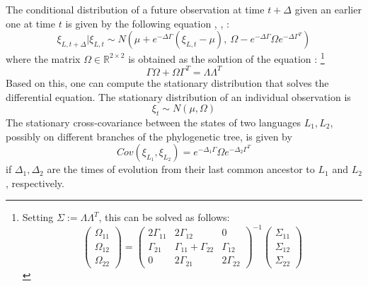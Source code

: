 \documentclass[11pt,a4paper]{article}
\begin{document}
The conditional distribution of a future observation at time $t+\Delta$ given an earlier one at time $t$ is given by the following equation \citep[Theorem 3.3]{schach1971weak}, \citep{gardiner1983handbook}, \citep[p. 156, eq. 6.124]{risken1989fokker}:
\begin{equation}
\xi_{L,t+\Delta} | \xi_{L,t} \sim N\left(\mu + e^{-\Delta \Gamma} (\xi_{L,t}-\mu),\ \Omega - e^{-\Delta \Gamma} \Omega e^{-\Delta \Gamma^T}\right)
\end{equation}
where the matrix $\Omega \in \mathbb{R}^{2\times 2}$ is obtained as the solution of the equation \citep[p. 110, eq. 4.4.51]{gardiner1983handbook} \citep[p. 156, eq. 6.126]{risken1989fokker}:
\footnote{Setting $\Sigma := \Lambda\Lambda^T$, this can be solved as follows:
\begin{equation}
\left(\begin{matrix} \Omega_{11} \\ \Omega_{12} \\ \Omega_{22} \end{matrix}\right)=    \left(\begin{matrix}
    2\Gamma_{11} & 2\Gamma_{12} & 0 \\
    \Gamma_{21} & \Gamma_{11}+\Gamma_{22} & \Gamma_{12} \\
    0 & 2\Gamma_{21} & 2\Gamma_{22}
    \end{matrix}\right)^{-1}  \left(\begin{matrix} \Sigma_{11} \\ \Sigma_{12} \\ \Sigma_{22} \end{matrix}\right)
\end{equation}
}
\begin{equation}
    \Gamma\Omega+\Omega\Gamma^T = \Lambda \Lambda^T
\end{equation}
Based on this, one can compute the stationary distribution that solves the differential equation.
The stationary distribution of an individual observation is
\begin{equation}\label{eq:ornuhl-var}
\xi_{t} \sim N\left(\mu, \Omega \right)
\end{equation}
The stationary cross-covariance between the states of two languages $L_1, L_2$, possibly on different branches of the phylogenetic tree, is given by
\begin{equation}\label{eq:ornuhl-covar}
Cov(\xi_{L_1}, \xi_{L_2}) = e^{-\Delta_1 \Gamma} \Omega e^{-\Delta_2 \Gamma^T}
\end{equation}
if $\Delta_1, \Delta_2$ are the times of evolution from their last common ancestor to $L_1$ and $L_2$, respectively.
\end{document}

